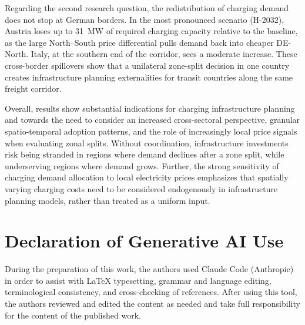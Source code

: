 \documentclass[conference]{IEEEtran}
\begin{document}
Regarding the second research question, the redistribution of charging demand does not stop at German borders. In the most pronounced scenario (H-2032), Austria loses up to 31~MW of required charging capacity relative to the baseline, as the large North--South price differential pulls demand back into cheaper DE-North. Italy, at the southern end of the corridor, sees a moderate increase. These cross-border spillovers show that a unilateral zone-split decision in one country creates infrastructure planning externalities for transit countries along the same freight corridor.

Overall, results show substantial indications for charging infrastructure planning and towards the need to consider an increased cross-sectoral perspective, granular spatio-temporal adoption patterns, and the role of increasingly local price signals when evaluating zonal splits. 
Without coordination, infrastructure investments risk being stranded in regions where demand declines after a zone split, while underserving regions where demand grows. Further, the strong sensitivity of charging demand allocation to local electricity prices emphasizes that spatially varying charging costs need to be considered endogenously in infrastructure planning models, rather than treated as a uniform input.




\section*{Declaration of Generative AI Use}

During the preparation of this work, the authors used Claude Code (Anthropic) in order to assist with \LaTeX{} typesetting, grammar and language editing, terminological consistency, and cross-checking of references. After using this tool, the authors reviewed and edited the content as needed and take full responsibility for the content of the published work.
\end{document}

